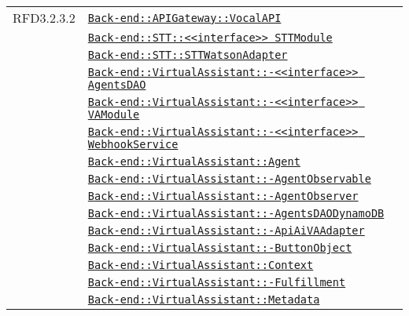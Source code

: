 \begin{longtable}{|>{\centering}m{3cm}|m{10cm}<{\centering}|}
RFD3.2.3.2 & \hyperref[Back-end::APIGateway::VocalAPI]{\texttt{Back-end::APIGateway::VocalAPI}}\\
& \hyperref[Back-end::STT::<<interface>> STTModule]{\texttt{Back-end::STT::<<interface>> STTModule}}\\
& \hyperref[Back-end::STT::STTWatsonAdapter]{\texttt{Back-end::STT::STTWatsonAdapter}}\\
& \hyperref[Back-end::VirtualAssistant::<<interface>> AgentsDAO]{\texttt{Back-end::VirtualAssistant::-\linebreak <<interface>> AgentsDAO}}\\
& \hyperref[Back-end::VirtualAssistant::<<interface>> VAModule]{\texttt{Back-end::VirtualAssistant::-\linebreak <<interface>> VAModule}}\\
& \hyperref[Back-end::VirtualAssistant::<<interface>> WebhookService]{\texttt{Back-end::VirtualAssistant::-\linebreak <<interface>> WebhookService}}\\
& \hyperref[Back-end::VirtualAssistant::Agent]{\texttt{Back-end::VirtualAssistant::Agent}}\\
& \hyperref[Back-end::VirtualAssistant::AgentObservable]{\texttt{Back-end::VirtualAssistant::-\linebreak AgentObservable}}\\
& \hyperref[Back-end::VirtualAssistant::AgentObserver]{\texttt{Back-end::VirtualAssistant::-\linebreak AgentObserver}}\\
& \hyperref[Back-end::VirtualAssistant::AgentsDAODynamoDB]{\texttt{Back-end::VirtualAssistant::-\linebreak AgentsDAODynamoDB}}\\
& \hyperref[Back-end::VirtualAssistant::ApiAiVAAdapter]{\texttt{Back-end::VirtualAssistant::-\linebreak ApiAiVAAdapter}}\\
& \hyperref[Back-end::VirtualAssistant::ButtonObject]{\texttt{Back-end::VirtualAssistant::-\linebreak ButtonObject}}\\
& \hyperref[Back-end::VirtualAssistant::Context]{\texttt{Back-end::VirtualAssistant::Context}}\\
& \hyperref[Back-end::VirtualAssistant::Fulfillment]{\texttt{Back-end::VirtualAssistant::-\linebreak Fulfillment}}\\
& \hyperref[Back-end::VirtualAssistant::Metadata]{\texttt{Back-end::VirtualAssistant::Metadata}}\\

\end{longtable}
